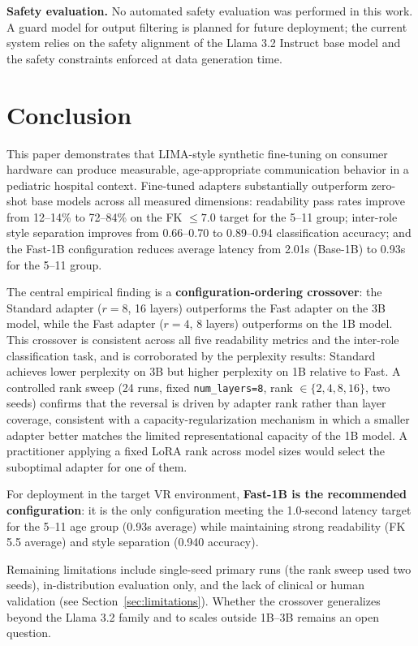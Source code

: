 \documentclass[journal]{IEEEtai}
\begin{document}
\textbf{Safety evaluation.} No automated safety evaluation was performed in this work. A guard model for output filtering is planned for future deployment; the current system relies on the safety alignment of the Llama 3.2 Instruct base model and the safety constraints enforced at data generation time.

\section{Conclusion}

This paper demonstrates that LIMA-style synthetic fine-tuning on consumer hardware can produce measurable, age-appropriate communication behavior in a pediatric hospital context. Fine-tuned adapters substantially outperform zero-shot base models across all measured dimensions: readability pass rates improve from 12--14\% to 72--84\% on the FK $\leq 7.0$ target for the 5--11 group; inter-role style separation improves from 0.66--0.70 to 0.89--0.94 classification accuracy; and the Fast-1B configuration reduces average latency from 2.01s (Base-1B) to 0.93s for the 5--11 group.

The central empirical finding is a \textbf{configuration-ordering crossover}: the Standard adapter ($r = 8$, 16 layers) outperforms the Fast adapter on the 3B model, while the Fast adapter ($r = 4$, 8 layers) outperforms on the 1B model. This crossover is consistent across all five readability metrics and the inter-role classification task, and is corroborated by the perplexity results: Standard achieves lower perplexity on 3B but higher perplexity on 1B relative to Fast. A controlled rank sweep (24 runs, fixed \texttt{num\_layers=8}, rank $\in \{2,4,8,16\}$, two seeds) confirms that the reversal is driven by adapter rank rather than layer coverage, consistent with a capacity-regularization mechanism in which a smaller adapter better matches the limited representational capacity of the 1B model. A practitioner applying a fixed LoRA rank across model sizes would select the suboptimal adapter for one of them.

For deployment in the target VR environment, \textbf{Fast-1B is the recommended configuration}: it is the only configuration meeting the 1.0-second latency target for the 5--11 age group (0.93s average) while maintaining strong readability (FK 5.5 average) and style separation (0.940 accuracy).

Remaining limitations include single-seed primary runs (the rank sweep used two seeds), in-distribution evaluation only, and the lack of clinical or human validation (see Section~\ref{sec:limitations}). Whether the crossover generalizes beyond the Llama 3.2 family and to scales outside 1B--3B remains an open question.
\end{document}
